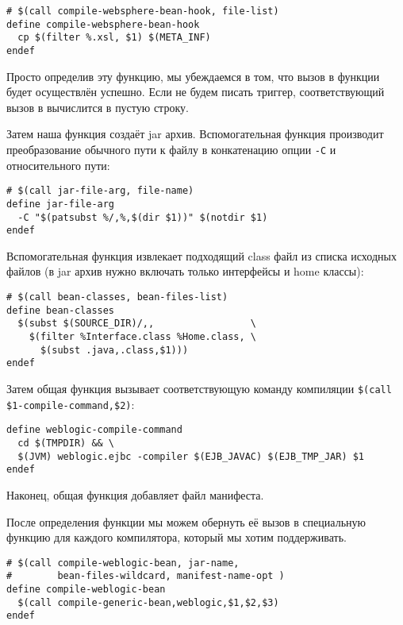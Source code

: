 {\footnotesize
\begin{verbatim}
# $(call compile-websphere-bean-hook, file-list)
define compile-websphere-bean-hook
  cp $(filter %.xsl, $1) $(META_INF)
endef
\end{verbatim}
}

Просто определив эту функцию, мы убеждаемся в том, что вызов
 в функции  будет
осуществлён успешно. Если не будем писать триггер, соответствующий
вызов в  вычислится в пустую строку.

Затем наша функция создаёт jar архив. Вспомогательная функция
 производит преобразование обычного
пути к файлу в конкатенацию опции \texttt{-C} и относительного пути:

{\footnotesize
\begin{verbatim}
# $(call jar-file-arg, file-name)
define jar-file-arg
  -C "$(patsubst %/,%,$(dir $1))" $(notdir $1)
endef
\end{verbatim}
}

Вспомогательная функция  извлекает
подходящий class файл из списка исходных файлов (в jar архив нужно
включать только интерфейсы и home классы):

{\footnotesize
\begin{verbatim}
# $(call bean-classes, bean-files-list)
define bean-classes
  $(subst $(SOURCE_DIR)/,,                 \
    $(filter %Interface.class %Home.class, \
      $(subst .java,.class,$1)))
endef
\end{verbatim}
}

Затем общая функция вызывает соответствующую команду компиляции
\texttt{\$(call \$1\hyp{}compile\hyp{}command,\$2)}:

{\footnotesize
\begin{verbatim}
define weblogic-compile-command
  cd $(TMPDIR) && \
  $(JVM) weblogic.ejbc -compiler $(EJB_JAVAC) $(EJB_TMP_JAR) $1
endef
\end{verbatim}
}

Наконец, общая функция добавляет файл манифеста.

После определения функции  мы можем
обернуть её вызов в специальную функцию для каждого компилятора,
который мы хотим поддерживать.

{\footnotesize
\begin{verbatim}
# $(call compile-weblogic-bean, jar-name,
#        bean-files-wildcard, manifest-name-opt )
define compile-weblogic-bean
  $(call compile-generic-bean,weblogic,$1,$2,$3)
endef
\end{verbatim}
}

